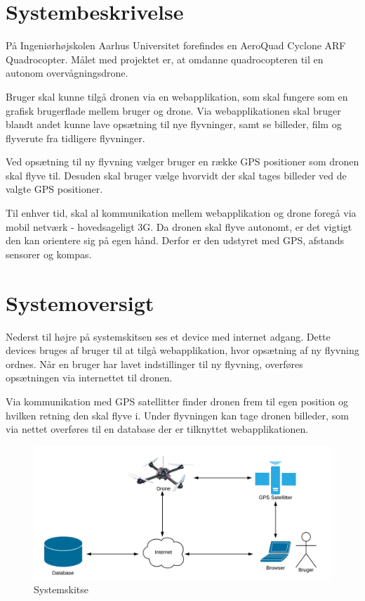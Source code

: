 \section{Systembeskrivelse}
På Ingeniørhøjskolen Aarhus Universitet forefindes en AeroQuad Cyclone ARF Quadrocopter. 
Målet med projektet er, at omdanne quadrocopteren til en autonom overvågningsdrone.

Bruger skal kunne tilgå dronen via en webapplikation, som skal fungere som en grafisk brugerflade mellem bruger og drone. Via webapplikationen skal bruger blandt andet kunne lave opsætning til nye flyvninger, samt se billeder, film og flyverute fra tidligere flyvninger. 

Ved opsætning til ny flyvning vælger bruger en række GPS positioner som dronen skal flyve til. Desuden skal bruger vælge hvorvidt der skal tages billeder ved de valgte GPS positioner. 

Til enhver tid, skal al kommunikation mellem webapplikation og drone foregå via mobil netværk - hovedsageligt 3G. Da dronen skal flyve autonomt, er det vigtigt den kan orientere sig på egen hånd. Derfor er den udstyret med GPS, afstands sensorer og kompas.


\section{Systemoversigt}
Nederst til højre på systemskitsen ses et device med internet adgang. Dette devices bruges af bruger til at tilgå webapplikation, hvor opsætning af ny flyvning ordnes. Når en bruger har lavet indstillinger til ny flyvning, overføres opsætningen via internettet til dronen.
 
Via kommunikation med GPS satellitter finder dronen frem til egen position og hvilken retning den skal flyve i. Under flyvningen kan tage dronen billeder, som via nettet overføres til en database der er tilknyttet webapplikationen.

\vspace{-5pt}
\begin{figure}[H]
\centering
\includegraphics[width=1\textwidth]{Billeder/Projektbeskrivelse.png}
\vspace{-5pt}
\caption{Systemskitse}
\label{fig:Systemskitse}
\end{figure}